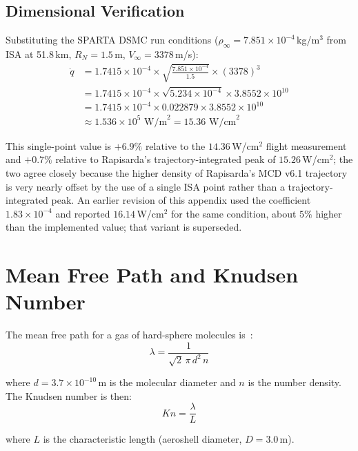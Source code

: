 \subsection{Dimensional Verification}

Substituting the SPARTA DSMC run conditions ($\rho_\infty = 7.851 \times 10^{-4}$\,kg/m$^3$ from ISA at 51.8\,km, $R_N = 1.5$\,m, $V_\infty = 3378$\,m/s):
\begin{align}
    \dot{q} &= 1.7415 \times 10^{-4} \times \sqrt{\frac{7.851 \times 10^{-4}}{1.5}} \times (3378)^3 \nonumber \\
    &= 1.7415 \times 10^{-4} \times \sqrt{5.234 \times 10^{-4}} \times 3.8552 \times 10^{10} \nonumber \\
    &= 1.7415 \times 10^{-4} \times 0.022879 \times 3.8552 \times 10^{10} \nonumber \\
    &\approx 1.536 \times 10^{5} \text{ W/m}^2 = 15.36 \text{ W/cm}^2
    \label{eq:sg_baseline}
\end{align}

\noindent This single-point value is $+6.9\%$ relative to the $14.36$\,W/cm$^2$ flight measurement and $+0.7\%$ relative to Rapisarda's trajectory-integrated peak of $15.26$\,W/cm$^2$; the two agree closely because the higher density of Rapisarda's MCD v6.1 trajectory is very nearly offset by the use of a single ISA point rather than a trajectory-integrated peak. An earlier revision of this appendix used the coefficient $1.83 \times 10^{-4}$ and reported $16.14$\,W/cm$^2$ for the same condition, about $5\%$ higher than the implemented value; that variant is superseded.

\section{Mean Free Path and Knudsen Number}

The mean free path for a gas of hard-sphere molecules is~\cite{bird1994molecular}:
\begin{equation}
    \lambda = \frac{1}{\sqrt{2} \, \pi \, d^2 \, n}
    \label{eq:mfp_derivation}
\end{equation}

\noindent where $d = 3.7 \times 10^{-10}$\,m is the molecular diameter and $n$ is the number density. The Knudsen number is then:
\begin{equation}
    Kn = \frac{\lambda}{L}
    \label{eq:kn_derivation}
\end{equation}

\noindent where $L$ is the characteristic length (aeroshell diameter, $D = 3.0$\,m).

